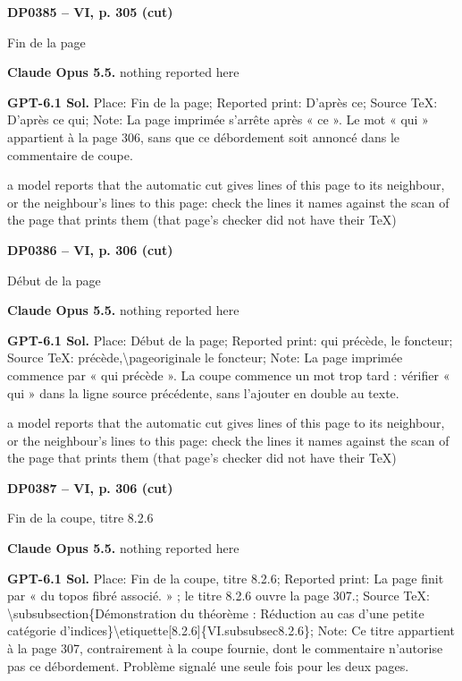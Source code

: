 \par\noindent\hypertarget{DP0385}{}\textbf{DP0385 -- VI, p. 305 (cut)}\par
Fin de la page\par
\textbf{Claude Opus 5.5.} nothing reported here\par
\textbf{GPT-6.1 Sol.} Place: Fin de la page; Reported print: D'après ce; Source TeX: D'après ce qui; Note: La page imprimée s'arrête après « ce ». Le mot « qui » appartient à la page 306, sans que ce débordement soit annoncé dans le commentaire de coupe.\par
a model reports that the automatic cut gives lines of this page to its neighbour, or the neighbour's lines to this page: check the lines it names against the scan of the page that prints them (that page's checker did not have their TeX)\par
\par\noindent\hypertarget{DP0386}{}\textbf{DP0386 -- VI, p. 306 (cut)}\par
Début de la page\par
\textbf{Claude Opus 5.5.} nothing reported here\par
\textbf{GPT-6.1 Sol.} Place: Début de la page; Reported print: qui précède, le foncteur; Source TeX: précède,\textbackslash{}pageoriginale le foncteur; Note: La page imprimée commence par « qui précède ». La coupe commence un mot trop tard : vérifier « qui » dans la ligne source précédente, sans l'ajouter en double au texte.\par
a model reports that the automatic cut gives lines of this page to its neighbour, or the neighbour's lines to this page: check the lines it names against the scan of the page that prints them (that page's checker did not have their TeX)\par
\par\noindent\hypertarget{DP0387}{}\textbf{DP0387 -- VI, p. 306 (cut)}\par
Fin de la coupe, titre 8.2.6\par
\textbf{Claude Opus 5.5.} nothing reported here\par
\textbf{GPT-6.1 Sol.} Place: Fin de la coupe, titre 8.2.6; Reported print: La page finit par « du topos fibré associé. » ; le titre 8.2.6 ouvre la page 307.; Source TeX: \textbackslash{}subsubsection\{Démonstration du théorème : Réduction au cas d'une   petite catégorie d'indices\}\textbackslash{}etiquette[8.2.6]\{VI.subsubsec8.2.6\}; Note: Ce titre appartient à la page 307, contrairement à la coupe fournie, dont le commentaire n'autorise pas ce débordement. Problème signalé une seule fois pour les deux pages.\par
